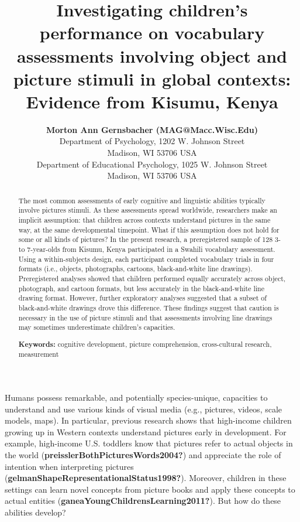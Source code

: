 \documentclass[10pt, letterpaper]{article}
\title{Investigating children's performance on vocabulary assessments
involving object and picture stimuli in global contexts: Evidence from
Kisumu, Kenya}
\author{{\large \bf Morton Ann Gernsbacher (MAG@Macc.Wisc.Edu)} \\ Department of Psychology, 1202 W. Johnson Street \\ Madison, WI 53706 USA
  \AND {\large \bf Sharon J.~Derry (SDJ@Macc.Wisc.Edu)} \\ Department of Educational Psychology, 1025 W. Johnson Street \\ Madison, WI 53706 USA}
\begin{document}
\maketitle

\begin{abstract}
The most common assessments of early cognitive and linguistic abilities
typically involve pictures stimuli. As these assessments spread
worldwide, researchers make an implicit assumption: that children across
contexts understand pictures in the same way, at the same developmental
timepoint. What if this assumption does not hold for some or all kinds
of pictures? In the present research, a preregistered sample of 128 3-
to 7-year-olds from Kisumu, Kenya participated in a Swahili vocabulary
assessment. Using a within-subjects design, each participant completed
vocabulary trials in four formats (i.e., objects, photographs, cartoons,
black-and-white line drawings). Preregistered analyses showed that
children performed equally accurately across object, photograph, and
cartoon formats, but less accurately in the black-and-white line drawing
format. However, further exploratory analyses suggested that a subset of
black-and-white drawings drove this difference. These findings suggest
that caution is necessary in the use of picture stimuli and that
assessments involving line drawings may sometimes underestimate
children's capacities.

\textbf{Keywords:}
cognitive development, picture comprehension, cross-cultural research,
measurement
\end{abstract}

Humans possess remarkable, and potentially species-unique, capacities to
understand and use various kinds of visual media (e.g., pictures,
videos, scale models, maps). In particular, previous research shows that
high-income children growing up in Western contexts understand pictures
early in development. For example, high-income U.S. toddlers know that
pictures refer to actual objects in the world
(\textbf{preisslerBothPicturesWords2004?}) and appreciate the role of
intention when interpreting pictures
(\textbf{gelmanShapeRepresentationalStatus1998?}). Moreover, children in
these settings can learn novel concepts from picture books and apply
these concepts to actual entities
(\textbf{ganeaYoungChildrensLearning2011?}). But how do these abilities
develop?
\end{document}
